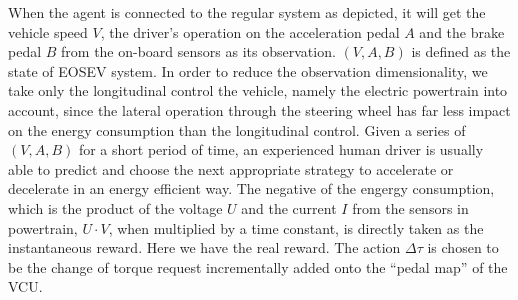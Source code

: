 \documentclass{article}
\begin{document}
When the agent is connected to the regular system as depicted, it will get the vehicle speed $V$, the driver's operation on the acceleration pedal $A$ and the brake pedal $B$ from the on-board sensors as its observation. $(V,A,B)$ is defined as the state of EOSEV system. In order to reduce the observation dimensionality, we take only the longitudinal control the vehicle, namely the electric powertrain into account, since the lateral operation through the steering wheel has far less impact on the energy consumption than the longitudinal control. Given a series of $(V,A,B)$ for a short period of time, an experienced human driver is usually able to predict and choose the next appropriate strategy to accelerate or decelerate in an energy efficient way. The negative of the engergy consumption, which is the product of the voltage $U$ and the current $I$ from the sensors in powertrain, $U\cdot V$, when multiplied by a time constant, is directly taken as the instantaneous reward. Here we have the real reward. The action $\Delta\tau$ is chosen to be the change of torque request incrementally added onto the ``pedal map'' of the VCU\@.
\end{document}
